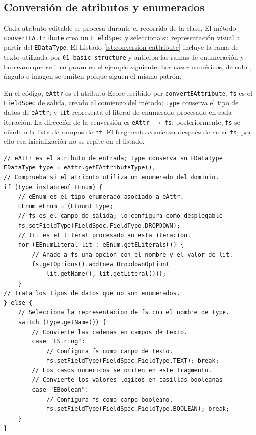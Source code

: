\subsection{Conversión de atributos y enumerados}

Cada atributo editable se procesa durante el recorrido de la clase. El método
\texttt{convert}\allowbreak\texttt{EAttribute} crea un \texttt{FieldSpec} y
selecciona su representación visual a partir del \texttt{EDataType}. El Listado
\ref{lst:conversion-eattribute} incluye la rama de texto utilizada por
\texttt{01\_basic\_structure} y anticipa las ramas de enumeración y booleano que
se incorporan en el ejemplo siguiente. Los casos numéricos, de color, ángulo e
imagen se omiten porque siguen el mismo patrón.

En el código, \texttt{eAttr} es el atributo Ecore recibido por
\texttt{convertEAttribute}; \texttt{fs} es el \texttt{FieldSpec} de salida,
creado al comienzo del método; \texttt{type} conserva el tipo de datos de
\texttt{eAttr}; y \texttt{lit} representa el literal de enumerado procesado en
cada iteración. La dirección de la conversión es
\texttt{eAttr} $\rightarrow$ \texttt{fs}; posteriormente, \texttt{fs} se añade
a la lista de campos de \texttt{bt}. El fragmento comienza después de crear
\texttt{fs}; por ello esa inicialización no se repite en el listado.

\newpage
\begin{lstlisting}[style=tfmjavaecore, captionpos=t, caption={Fragmento comentado de la conversión de atributos Ecore}, label={lst:conversion-eattribute}]
// eAttr es el atributo de entrada; type conserva su EDataType.
EDataType type = eAttr.getEAttributeType();
// Comprueba si el atributo utiliza un enumerado del dominio.
if (type instanceof EEnum) {
    // eEnum es el tipo enumerado asociado a eAttr.
    EEnum eEnum = (EEnum) type;
    // fs es el campo de salida; lo configura como desplegable.
    fs.setFieldType(FieldSpec.FieldType.DROPDOWN);
    // lit es el literal procesado en esta iteracion.
    for (EEnumLiteral lit : eEnum.getELiterals()) {
        // Anade a fs una opcion con el nombre y el valor de lit.
        fs.getOptions().add(new DropdownOption(
            lit.getName(), lit.getLiteral()));
    }
// Trata los tipos de datos que no son enumerados.
} else {
    // Selecciona la representacion de fs con el nombre de type.
    switch (type.getName()) {
        // Convierte las cadenas en campos de texto.
        case "EString":
            // Configura fs como campo de texto.
            fs.setFieldType(FieldSpec.FieldType.TEXT); break;
        // Los casos numericos se omiten en este fragmento.
        // Convierte los valores logicos en casillas booleanas.
        case "EBoolean":
            // Configura fs como campo booleano.
            fs.setFieldType(FieldSpec.FieldType.BOOLEAN); break;
    }
}
\end{lstlisting}

